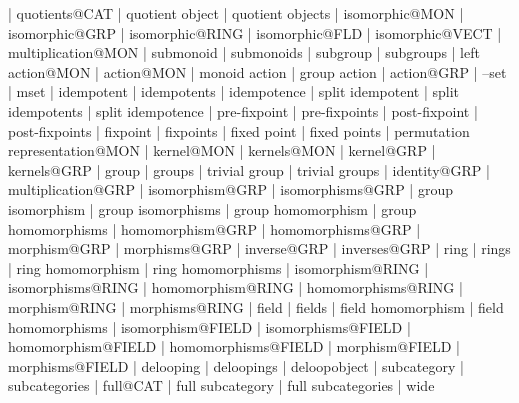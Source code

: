     |   quotients@CAT
    |   quotient object
    |   quotient objects
    |   isomorphic@MON
    |   isomorphic@GRP
    |   isomorphic@RING
    |   isomorphic@FLD
    |   isomorphic@VECT
    |   multiplication@MON
    |   submonoid
    |   submonoids
    |   subgroup
    |   subgroups
    |   left action@MON
    |   action@MON
    |   monoid action
    |   group action
    |   action@GRP
    |   --set
    |   mset
    |   idempotent
    |   idempotents
    |   idempotence 
    |   split idempotent
    |   split idempotents
    |   split idempotence 
    |   pre-fixpoint
    |   pre-fixpoints
    |   post-fixpoint
    |   post-fixpoints
    |   fixpoint
    |   fixpoints
    |   fixed point
    |   fixed points
    |   permutation representation@MON
    |   kernel@MON
    |   kernels@MON
    |   kernel@GRP
    |   kernels@GRP
    |   group
    |   groups
    |   trivial group
    |   trivial groups
    |   identity@GRP
    |   multiplication@GRP
    |   isomorphism@GRP
    |   isomorphisms@GRP
    |   group isomorphism
    |   group isomorphisms
    |   group homomorphism
    |   group homomorphisms
    |   homomorphism@GRP
    |   homomorphisms@GRP
    |   morphism@GRP
    |   morphisms@GRP
    |   inverse@GRP
    |   inverses@GRP
    |   ring
    |   rings
    |   ring homomorphism
    |   ring homomorphisms
    |   isomorphism@RING
    |   isomorphisms@RING
    |   homomorphism@RING
    |   homomorphisms@RING
    |   morphism@RING
    |   morphisms@RING
    |   field
    |   fields
    |   field homomorphism
    |   field homomorphisms
    |   isomorphism@FIELD
    |   isomorphisms@FIELD
    |   homomorphism@FIELD
    |   homomorphisms@FIELD
    |   morphism@FIELD
    |   morphisms@FIELD
    |   delooping
    |   deloopings
    |   deloopobject
    |   subcategory
    |   subcategories
    |   full@CAT
    |   full subcategory
    |   full subcategories
    |   wide
